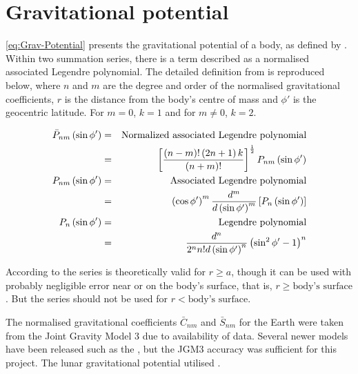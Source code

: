 \chapter{Gravitational potential} \label{cha:Gravitational-potential}

\autoref{eq:Grav-Potential} presents the gravitational potential of a body, as defined by \textcite{WGS84}. Within two summation series, there is a term described as a normalised associated Legendre polynomial. The detailed definition from \textcite{WGS84} is reproduced below, where $n$ and $m$ are the degree and order of the normalised gravitational coefficients, $r$ is the distance from the body’s centre of mass and $\phi'$ is the geocentric latitude. For $m = 0$, $k = 1$ and for $m \neq 0$, $k = 2$.

\begin{eqnarray}\notag
\bar{P}_{nm}\left(\sin\phi'\right) & = & \text{Normalized associated Legendre polynomial}\\
 & = & \left[\frac{\left(n-m\right)!\left(2n+1\right)k}{\left(n+m\right)!}\right]^{\frac{1}{2}}P_{nm}\left(\sin\phi'\right)\\\notag
P_{nm}\left(\sin\phi'\right) & = & \text{Associated Legendre polynomial}\\
 & = & \left(\cos\phi'\right)^{m}\frac{d^{m}}{d\left(\sin\phi'\right)^{m}}\left[P_{n}\left(\sin\phi'\right)\right]\\\notag
P_{n}\left(\sin\phi'\right) & = & \text{Legendre polynomial}\\
 & = & \frac{d^{n}}{2^{n}n!d\left(\sin\phi'\right)^{n}}\left(\sin^{2}\phi'-1\right)^{n}
\end{eqnarray}

According to \textcite{WGS84} the series is theoretically valid for $r\geq a$, though it can be used with probably negligible error near or on the body's surface, that is, $r\geq\text{body's surface}$. But the series should not be used for $r<\text{body's surface}$.

The normalised gravitational coefficients $\bar{C}_{nm}$ and $\bar{S}_{nm}$ for the Earth were taken from the Joint Gravity Model 3 \cite{Tapley1996} due to availability of data. Several newer models have been released such as the \textcite{EIGEN-5C}, but the JGM3 accuracy was sufficient for this project. The lunar gravitational potential utilised \textcite{LP165}.